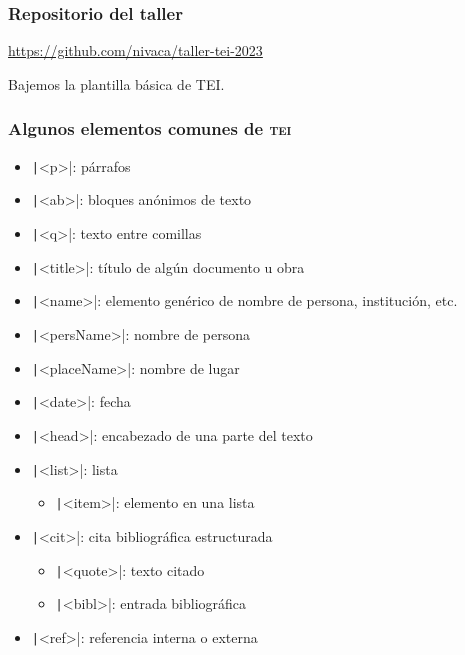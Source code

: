 \documentclass[%
  handout, %
  ]{beamer}
\newcommand*{\TEI}{\textsc{tei}}
\begin{document}
\begin{frame}
  \frametitle{Repositorio del taller}

  \centering

  \url{https://github.com/nivaca/taller-tei-2023}

  \bigskip

  Bajemos la plantilla básica de TEI.

  
\end{frame}


\begin{frame}
  \frametitle{Algunos elementos comunes de \TEI}
  \begin{itemize}
    \item \texttt|<p>|: párrafos
    \item \texttt|<ab>|: bloques anónimos de texto
    \item \texttt|<q>|: texto entre comillas
    \item \texttt|<title>|: título de algún documento u obra
    \item \texttt|<name>|: elemento genérico de nombre de persona, institución, etc.
    \item \texttt|<persName>|: nombre de persona
    \item \texttt|<placeName>|: nombre de lugar
    \item \texttt|<date>|: fecha
    \item \texttt|<head>|: encabezado de una parte del texto
    \item \texttt|<list>|: lista
      \begin{itemize}
        \item \texttt|<item>|: elemento en una lista
      \end{itemize}
    \item \texttt|<cit>|: cita bibliográfica estructurada
      \begin{itemize}
        \item \texttt|<quote>|: texto citado
        \item \texttt|<bibl>|: entrada bibliográfica
      \end{itemize}
    \item \texttt|<ref>|: referencia interna o externa
  \end{itemize}
\end{frame}
\end{document}
